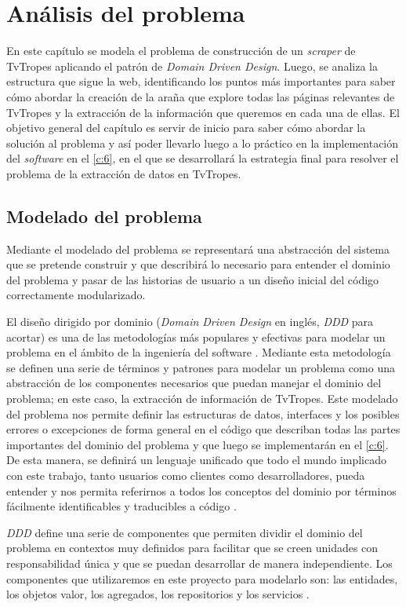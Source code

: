 \chapter{Análisis del problema}
En este capítulo se modela el problema de construcción de un \textit{scraper} de
TvTropes aplicando el patrón de \textit{Domain Driven Design}. Luego, se analiza
la estructura que sigue la web, identificando los puntos más importantes para
saber cómo abordar la creación de la araña que explore todas las páginas
relevantes de TvTropes y la extracción de la información que queremos en cada
una de ellas. El objetivo general del capítulo es servir de inicio para saber
cómo abordar la solución al problema y así poder llevarlo luego a lo práctico en
la implementación del \textit{software} en el \autoref{c:6}, en el que se
desarrollará la estrategia final para resolver el problema de la extracción de
datos en TvTropes.

\section{Modelado del problema}
Mediante el modelado del problema se representará una abstracción del sistema
que se pretende construir y que describirá lo necesario para entender el dominio
del problema y pasar de las historias de usuario a un diseño inicial del código
correctamente modularizado. 

El diseño dirigido por dominio (\textit{Domain Driven Design} en inglés,
\textit{DDD} para acortar) es una de las metodologías más populares y efectivas
para modelar un problema en el ámbito de la ingeniería del software
\cite{ddd_golang}. Mediante esta metodología se definen una serie de términos y
patrones para modelar un problema como una abstracción de los componentes
necesarios que puedan manejar el dominio del problema; en este caso, la
extracción de información de TvTropes. Este modelado del problema nos permite
definir las estructuras de datos, interfaces y los posibles errores o
excepciones de forma general en el código que describan todas las partes
importantes del dominio del problema y que luego se implementarán en el
\autoref{c:6}. De esta manera, se definirá un lenguaje unificado que todo el
mundo implicado con este trabajo, tanto usuarios como clientes como
desarrolladores, pueda entender y nos permita referirnos a todos los conceptos
del dominio por términos fácilmente identificables y traducibles a código
\cite{ddd_golang}.

\textit{DDD} define una serie de componentes que permiten dividir el dominio del
problema en contextos muy definidos para facilitar que se creen unidades con
responsabilidad única y que se puedan desarrollar de manera independiente. Los
componentes que utilizaremos en este proyecto para modelarlo son: las entidades,
los objetos valor, los agregados, los repositorios y los servicios
\cite{ddd_golang}. 

